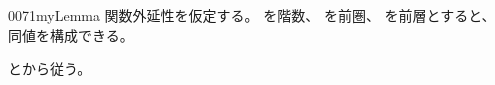 \documentclass[index]{subfiles}
\begin{document}
\begin{myBlock}{0071}{myLemma}
  関数外延性を仮定する。
  を階数、
  を前圏、
  を前層とすると、
  同値を構成できる。
\end{myBlock}
\begin{myProof}
  とから従う。
\end{myProof}
\end{document}
